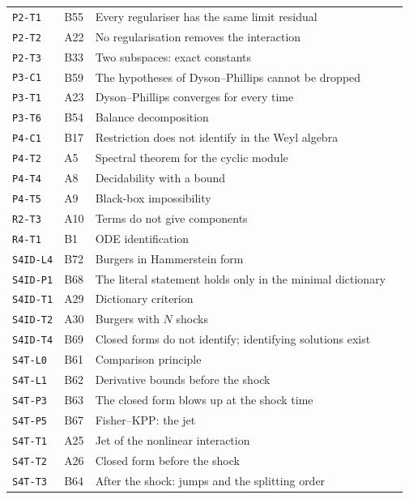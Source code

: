 \documentclass[11pt,a4paper,oneside]{report}
\begin{document}
\begin{center}
\begin{longtable}{@{}L{3.0cm}L{1.2cm}L{8.4cm}L{1.2cm}@{}}
\texttt{P2-T1} & B55 & Every regulariser has the same limit residual & \pageref{dim:P2-T1}\\
\texttt{P2-T2} & A22 & No regularisation removes the interaction & \pageref{dim:P2-T2}\\
\texttt{P2-T3} & B33 & Two subspaces: exact constants & \pageref{dim:P2-T3}\\
\texttt{P3-C1} & B59 & The hypotheses of Dyson--Phillips cannot be dropped & \pageref{dim:P3-C1}\\
\texttt{P3-T1} & A23 & Dyson--Phillips converges for every time & \pageref{dim:P3-T1}\\
\texttt{P3-T6} & B54 & Balance decomposition & \pageref{dim:P3-T6}\\
\texttt{P4-C1} & B17 & Restriction does not identify in the Weyl algebra & \pageref{dim:P4-C1}\\
\texttt{P4-T2} & A5 & Spectral theorem for the cyclic module & \pageref{dim:P4-T2}\\
\texttt{P4-T4} & A8 & Decidability with a bound & \pageref{dim:P4-T4}\\
\texttt{P4-T5} & A9 & Black-box impossibility & \pageref{dim:P4-T5}\\
\texttt{R2-T3} & A10 & Terms do not give components & \pageref{dim:R2-T3}\\
\texttt{R4-T1} & B1 & ODE identification & \pageref{dim:R4-T1}\\
\texttt{S4ID-L4} & B72 & Burgers in Hammerstein form & \pageref{dim:S4ID-L4}\\
\texttt{S4ID-P1} & B68 & The literal statement holds only in the minimal dictionary & \pageref{dim:S4ID-P1}\\
\texttt{S4ID-T1} & A29 & Dictionary criterion & \pageref{dim:S4ID-T1}\\
\texttt{S4ID-T2} & A30 & Burgers with $N$ shocks & \pageref{dim:S4ID-T2}\\
\texttt{S4ID-T4} & B69 & Closed forms do not identify; identifying solutions exist & \pageref{dim:S4ID-T4}\\
\texttt{S4T-L0} & B61 & Comparison principle & \pageref{dim:S4T-L0}\\
\texttt{S4T-L1} & B62 & Derivative bounds before the shock & \pageref{dim:S4T-L1}\\
\texttt{S4T-P3} & B63 & The closed form blows up at the shock time & \pageref{dim:S4T-P3}\\
\texttt{S4T-P5} & B67 & Fisher--KPP: the jet & \pageref{dim:S4T-P5}\\
\texttt{S4T-T1} & A25 & Jet of the nonlinear interaction & \pageref{dim:S4T-T1}\\
\texttt{S4T-T2} & A26 & Closed form before the shock & \pageref{dim:S4T-T2}\\
\texttt{S4T-T3} & B64 & After the shock: jumps and the splitting order & \pageref{dim:S4T-T3}\\
\bottomrule
\end{longtable}
\end{center}
\end{document}
